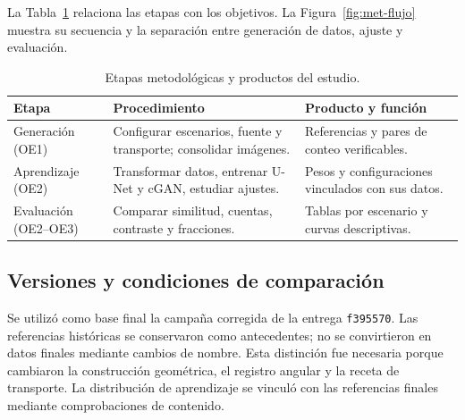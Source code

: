 La Tabla~\ref{tab:met-etapas} relaciona las etapas con los objetivos. La Figura~\ref{fig:met-flujo} muestra su secuencia y la separación entre generación de datos, ajuste y evaluación.
\begin{table}[htbp]\centering\small
\caption{Etapas metodológicas y productos del estudio.}\label{tab:met-etapas}
\begin{tabularx}{\linewidth}{@{}p{2.5cm}XX@{}}\toprule
Etapa & Procedimiento & Producto y función\\\midrule
Generación (OE1) & Configurar escenarios, fuente y transporte; consolidar imágenes. & Referencias y pares de conteo verificables.\\
Aprendizaje (OE2) & Transformar datos, entrenar U-Net y cGAN, estudiar ajustes. & Pesos y configuraciones vinculados con sus datos.\\
Evaluación (OE2--OE3) & Comparar similitud, cuentas, contraste y fracciones. & Tablas por escenario y curvas descriptivas.\\\bottomrule
\end{tabularx}\end{table}

\subsection{Versiones y condiciones de comparación}
Se utilizó como base final la campaña corregida de la entrega \texttt{f395570}. Las referencias históricas se conservaron como antecedentes; no se convirtieron en datos finales mediante cambios de nombre. Esta distinción fue necesaria porque cambiaron la construcción geométrica, el registro angular y la receta de transporte. La distribución de aprendizaje se vinculó con las referencias finales mediante comprobaciones de contenido.

